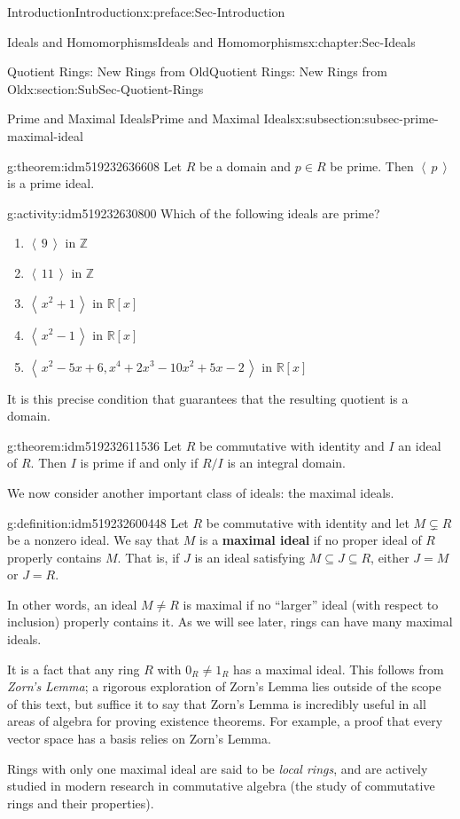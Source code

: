 \documentclass[oneside,10pt,]{book}
\newcommand{\terminology}[1]{\textbf{#1}}
\numberwithin{equation}{section}
\newcommand{\ideal}[1]{\left\langle\, #1 \,\right\rangle}
\def\Z{{\mathbb Z}}
\def\R{{\mathbb R}}
\begin{document}
\begin{preface}{Introduction}{}{Introduction}{}{}{x:preface:Sec-Introduction}
\begin{chapterptx}{Ideals and Homomorphisms}{}{Ideals and Homomorphisms}{}{}{x:chapter:Sec-Ideals}
\begin{sectionptx}{Quotient Rings: New Rings from Old}{}{Quotient Rings: New Rings from Old}{}{}{x:section:SubSec-Quotient-Rings}
\begin{subsectionptx}{Prime and Maximal Ideals}{}{Prime and Maximal Ideals}{}{}{x:subsection:subsec-prime-maximal-ideal}
\begin{theorem}{}{}{g:theorem:idm519232636608}
Let \(R\) be a domain and \(p\in R\) be prime. Then \(\ideal{p}\) is a prime ideal.%
\end{theorem}
\begin{activity}{}{g:activity:idm519232630800}%
Which of the following ideals are prime?%
\begin{enumerate}
\item{}\(\ideal{9}\) in \(\Z\)%
\item{}\(\ideal{11}\) in \(\Z\)%
\item{}\(\ideal{x^2+1}\) in \(\R[x]\)%
\item{}\(\ideal{x^2-1}\) in \(\R[x]\)%
\item{}\(\ideal{x^2-5x+6, x^4+2x^3-10x^2+5x-2}\) in \(\R[x]\)%
\end{enumerate}
%
\end{activity}
It is this precise condition that guarantees that the resulting quotient is a domain.%
\begin{theorem}{}{}{g:theorem:idm519232611536}%
Let \(R\) be commutative with identity and \(I\) an ideal of \(R\). Then \(I\) is prime if and only if \(R/I\) is an integral domain.%
\end{theorem}
We now consider another important class of ideals: the maximal ideals.%
\begin{definition}{}{g:definition:idm519232600448}%
%
%
Let \(R\) be commutative with identity and let \(M\subsetneq R\) be a nonzero ideal. We say that \(M\) is a \terminology{maximal ideal} if no proper ideal of \(R\) properly contains \(M\). That is, if \(J\) is an ideal satisfying \(M\subseteq J\subseteq R\), either \(J=M\) or \(J=R\).%
\end{definition}
In other words, an ideal \(M\ne R\) is maximal if no ``larger'' ideal (with respect to inclusion) properly contains it. As we will see later, rings can have many maximal ideals.%
\par
It is a fact that any ring \(R\) with \(0_R\ne 1_R\) has a maximal ideal. This follows from \emph{Zorn's Lemma}; a rigorous exploration of Zorn's Lemma lies outside of the scope of this text, but suffice it to say that Zorn's Lemma is incredibly useful in all areas of algebra for proving existence theorems. For example, a proof that every vector space has a basis relies on Zorn's Lemma.%
\par
Rings with only one maximal ideal are said to be \emph{local rings}, and are actively studied in modern research in commutative algebra (the study of commutative rings and their properties).%

\end{subsectionptx}
\end{sectionptx}
\end{chapterptx}
\end{preface}
\end{document}
